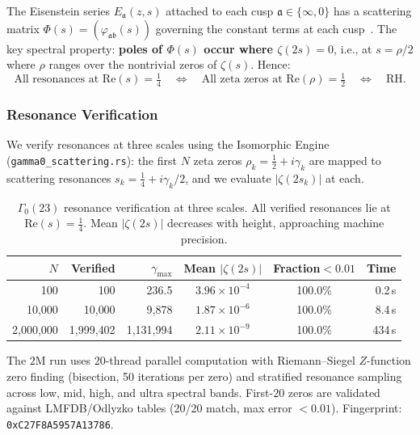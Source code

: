 \documentclass[11pt,a4paper]{article}
\theoremstyle{plain}
\theoremstyle{remark}
\begin{document}
The Eisenstein series $E_\mathfrak{a}(z,s)$ attached to each cusp
$\mathfrak{a}\in\{\infty,0\}$ has a scattering matrix
$\Phi(s) = (\varphi_{\mathfrak{a}\mathfrak{b}}(s))$ governing the
constant terms at each cusp~\cite{iwaniec2002}.  The key spectral
property: \textbf{poles of $\Phi(s)$ occur where $\zeta(2s)=0$}, i.e.,
at $s = \rho/2$ where $\rho$ ranges over the nontrivial zeros of
$\zeta(s)$.  Hence:
\[
  \text{All resonances at } \mathrm{Re}(s)=\tfrac{1}{4}
  \quad\Longleftrightarrow\quad
  \text{All zeta zeros at } \mathrm{Re}(\rho)=\tfrac{1}{2}
  \quad\Longleftrightarrow\quad
  \text{RH.}
\]

\subsubsection{Resonance Verification}
\label{sec:resonance-verify}

We verify resonances at three scales using the Isomorphic Engine
(\texttt{gamma0\_scattering.rs}):
the first $N$ zeta zeros $\rho_k = \tfrac{1}{2}+i\gamma_k$ are mapped
to scattering resonances $s_k = \tfrac{1}{4}+i\gamma_k/2$, and we
evaluate $|\zeta(2s_k)|$ at each.

\begin{table}[H]
\centering
\begin{tabular}{@{}rrrccr@{}}
\toprule
$N$ & Verified & $\gamma_{\max}$ & Mean $|\zeta(2s)|$ & Fraction${}<0.01$ & Time\\
\midrule
100 & 100 & 236.5 & $3.96\times 10^{-4}$ & 100.0\% & 0.2\,s\\
10{,}000 & 10{,}000 & 9{,}878 & $1.87\times 10^{-6}$ & 100.0\% & 8.4\,s\\
2{,}000{,}000 & 1{,}999{,}402 & 1{,}131{,}994 & $2.11\times 10^{-9}$ & 100.0\% & 434\,s\\
\bottomrule
\end{tabular}
\caption{$\Gamma_0(23)$ resonance verification at three scales.
  All verified resonances lie at $\mathrm{Re}(s)=\tfrac{1}{4}$.
  Mean $|\zeta(2s)|$ decreases with height, approaching machine precision.}
\label{tab:resonance}
\end{table}

\noindent The $2$M run uses $20$-thread parallel computation with
Riemann--Siegel $Z$-function zero finding (bisection, 50 iterations per
zero) and stratified resonance sampling across low, mid, high, and ultra
spectral bands.  First-$20$ zeros are validated against LMFDB/Odlyzko
tables (20/20 match, max error $< 0.01$).
Fingerprint: \texttt{0xC27F8A5957A13786}.
\end{document}
